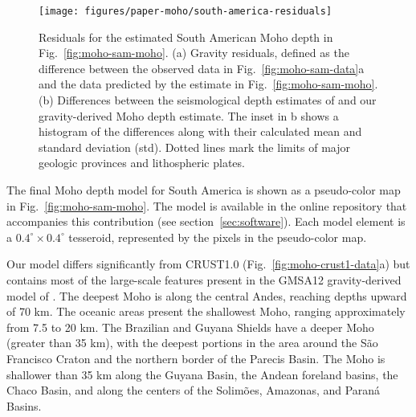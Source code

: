 \begin{figure}
    \centering
    \texttt{[image: figures/paper-moho/south-america-residuals]}
    \caption{
        Residuals for the estimated South American Moho depth in
        Fig.~\ref{fig:moho-sam-moho}.
        (a) Gravity residuals, defined as the difference between the observed data in Fig.~\ref{fig:moho-sam-data}a
        and the data predicted by the estimate in Fig.~\ref{fig:moho-sam-moho}.
        (b) Differences between the seismological depth estimates of
        \citet{assumpcao2013a} and our gravity-derived Moho depth estimate.
        The inset in b shows a histogram of the differences along with their
        calculated mean and standard deviation (std).
        Dotted lines mark the limits of major geologic provinces and
        lithospheric plates.
    }
    \label{fig:moho-sam-residuals}
\end{figure}


The final Moho depth model for South America is shown
as a pseudo-color map in Fig.~\ref{fig:moho-sam-moho}.
The model is available in the online repository that accompanies
this contribution (see section~\ref{sec:software}).
Each model element is a $0.4^\circ \times 0.4^\circ$ tesseroid,
represented by the pixels in the pseudo-color map.

Our model differs significantly from CRUST1.0 (Fig.~\ref{fig:moho-crust1-data}a)
but contains most of the large-scale features
present in the GMSA12 gravity-derived model of \citet{vandermeijde2013}.
The deepest Moho is along the central Andes, reaching depths upward of 70 km.
The oceanic areas present the shallowest Moho, ranging approximately
from 7.5 to 20 km.
The Brazilian and Guyana Shields have a deeper Moho (greater than 35 km),
with the deepest portions in the area around the São Francisco Craton
and the northern border of the Parecis Basin.
The Moho is shallower than 35 km along the Guyana Basin, the Andean foreland
basins, the Chaco Basin, and along the centers of the Solimões, Amazonas, and
Paraná Basins.

